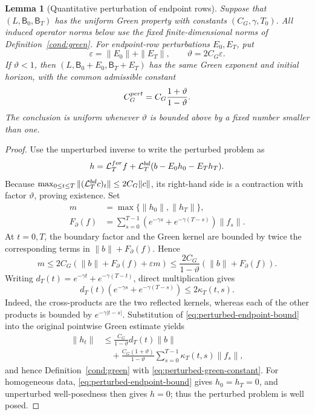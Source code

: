 \documentclass[twocolumn,nameyear,amsthm]{autart}
\newcommand{\Bzero}{\mathsf B_0}
\newcommand{\BT}{\mathsf B_T}
\numberwithin{equation}{section}
\newtheorem{lemma}[theorem]{Lemma}
\begin{document}
\begin{lemma}[Quantitative perturbation of endpoint rows]
\label{lem:boundary-row-perturbation}
Suppose that $(L,\Bzero,\BT)$ has the uniform Green property with constants
$(C_G,\gamma,T_0)$.  All induced operator norms below use the fixed
finite-dimensional norms of Definition~\ref{cond:green}.  For endpoint-row
perturbations $E_0,E_T$, put
\begin{equation}\label{eq:row-perturbation-size}
 \varepsilon=\|E_0\|+\|E_T\|,
 \qquad \vartheta=2C_G\varepsilon .
\end{equation}
If $\vartheta<1$, then $(L,\Bzero+E_0,\BT+E_T)$ has the same Green exponent
and initial horizon, with the common admissible constant
\begin{equation}\label{eq:perturbed-green-constant}
 C_G^{\rm pert}=C_G\frac{1+\vartheta}{1-\vartheta}.
\end{equation}
The conclusion is uniform whenever $\vartheta$ is bounded above by a fixed
number smaller than one.
\end{lemma}

\begin{proof}
Use the unperturbed inverse to write the perturbed problem as
\begin{equation}\label{eq:row-perturbation-fixed-point}
 h=\mathcal L_T^{\rm for}f+
   \mathcal L_T^{\rm bd}(b-E_0h_0-E_Th_T).
\end{equation}
Because
$\max_{0\le t\le T}\|(\mathcal L_T^{\rm bd}c)_t\|\le2C_G\|c\|$, its
right-hand side is a contraction with factor $\vartheta$, proving existence.
Set
\[
 \begin{aligned}
 m&=\max\{\|h_0\|,\|h_T\|\},\\
 F_\partial(f)&=\sum_{s=0}^{T-1}
 (e^{-\gamma s}+e^{-\gamma(T-s)})\|f_s\|.
 \end{aligned}
\]
At $t=0,T$, the boundary factor and the Green kernel are bounded by twice
the corresponding terms in $\|b\|+F_\partial(f)$.  Hence
\begin{equation}\label{eq:perturbed-endpoint-bound}
 m\le2C_G(\|b\|+F_\partial(f)+\varepsilon m)
 \le\frac{2C_G}{1-\vartheta}(\|b\|+F_\partial(f)).
\end{equation}
Writing $d_T(t)=e^{-\gamma t}+e^{-\gamma(T-t)}$, direct multiplication gives
\begin{equation}\label{eq:boundary-weight-product}
 d_T(t)(e^{-\gamma s}+e^{-\gamma(T-s)})
 \le2\kappa_T(t,s).
\end{equation}
Indeed, the cross-products are the two reflected kernels, whereas each of
the other products is bounded by $e^{-\gamma|t-s|}$.  Substitution of
\eqref{eq:perturbed-endpoint-bound} into the original pointwise Green
estimate yields
\[
 \begin{aligned}
 \|h_t\|&\le\frac{C_G}{1-\vartheta}d_T(t)\|b\|\\
 &\quad{}+\frac{C_G(1+\vartheta)}{1-\vartheta}
 \sum_{s=0}^{T-1}\kappa_T(t,s)\|f_s\|,
 \end{aligned}
\]
and hence Definition~\ref{cond:green} with
\eqref{eq:perturbed-green-constant}.  For homogeneous data,
\eqref{eq:perturbed-endpoint-bound} gives $h_0=h_T=0$, and unperturbed
well-posedness then gives $h=0$; thus the perturbed problem is well posed.
\end{proof}
\end{document}
